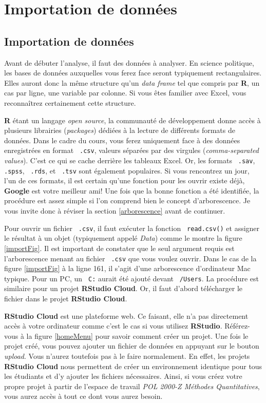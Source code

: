 \documentclass[10.5pt,a4paper]{article}
\newcommand{\rcode}[1]{\texttt{\color{rstudio} #1}}
\begin{document}
  
\section{Importation de données}\label{import}
  \subsection{Importation de données}
  Avant de débuter l'analyse, il faut des données à analyser. En science politique, les bases de données auxquelles vous ferez face seront typiquement rectangulaires. Elles auront donc la même structure qu'un \emph{data frame} tel que compris par \textbf{R}, un cas par ligne, une variable par colonne. Si vous êtes familier avec Excel, vous reconnaîtrez certainement cette structure. 
  
  \textbf{R} étant un langage \emph{open source}, la communauté de développement donne accès à plusieurs librairies (\emph{packages}) dédiées à la lecture de différents formats de données. Dans le cadre du cours, vous ferez uniquement face à des données enregistrées en format \rcode{.csv}, valeurs séparées par des virgules (\emph{comma-separated values}). C'est ce qui se cache derrière les tableaux Excel. Or, les formats \rcode{.sav}, \rcode{.spss}, \rcode{.rds}, et \rcode{.tsv} sont également populaires. Si vous rencontrez un jour, l'un de ces formats, il est certain qu'une fonction pour les ouvrir existe déjà, \textbf{Google} est votre meilleur ami! Une fois que la bonne fonction a été identifiée, la procédure est assez simple si l'on comprend bien le concept d'arborescence. Je vous invite donc à réviser la section \ref{arborescence} avant de continuer. 
  
  Pour ouvrir un fichier \rcode{.csv}, il faut exécuter la fonction \rcode{read.csv()} et assigner le résultat à un objet (typiquement appelé \emph{Data}) comme le montre la figure \ref{importFig}. Il est important de constater que le seul argument requis est l'arborescence menant au fichier \rcode{.csv} que vous voulez ouvrir. Dans le cas de la figure \ref{importFig} à la ligne 161, il s'agit d'une arborescence d'ordinateur Mac typique. Pour un PC, un \rcode{C:} aurait été ajouté devant \rcode{/Users}. La procédure est similaire pour un projet \textbf{RStudio Cloud}. Or, il faut d'abord télécharger le fichier dans le projet \textbf{RStudio Cloud}.
  
  \textbf{RStudio Cloud} est une plateforme web. Ce faisant, elle n'a pas directement accès à votre ordinateur comme c'est le cas si vous utilisez \textbf{RStudio}. Référez-vous à la figure \ref{homeMenu} pour savoir comment créer un projet. Une fois le projet créé, vous pouvez ajouter un fichier de données en appuyant sur le bouton \textit{upload}. Vous n'aurez toutefois pas à le faire normalement. En effet, les projets \textbf{RStudio Cloud} nous permettent de créer un environnement identique pour tous les étudiants et d'y ajouter les fichiers nécessaires. Ainsi, si vous créez votre propre projet à partir de l'espace de travail \emph{POL 2000-Z Méthodes Quantitatives}, vous aurez accès à tout ce dont vous aurez besoin. 
\end{document}
